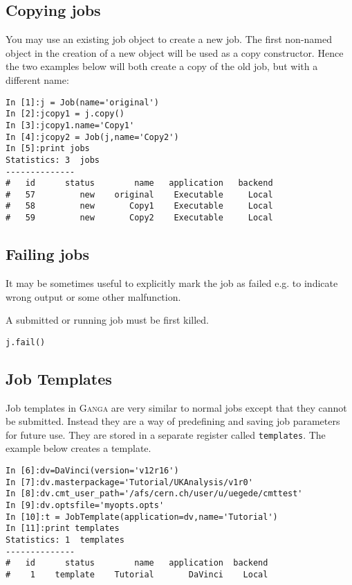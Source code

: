 \documentclass{howto}
\def\ganga {\textsc{Ganga}\xspace}
\begin{document}
\subsection{Copying jobs}
You may use an existing job object to create a new job. The first non-named
object in the creation of a new object will be used as a copy
constructor. Hence the two examples below will both create a copy of the old
job, but with a different name:
\begin{verbatim}
In [1]:j = Job(name='original')
In [2]:jcopy1 = j.copy()
In [3]:jcopy1.name='Copy1'
In [4]:jcopy2 = Job(j,name='Copy2')
In [5]:print jobs
Statistics: 3  jobs
--------------
#   id      status        name   application   backend 
#   57         new    original    Executable     Local 
#   58         new       Copy1    Executable     Local 
#   59         new       Copy2    Executable     Local 
\end{verbatim}

\subsection{Failing jobs}
It may be sometimes useful to explicitly mark the job as failed e.g. to indicate wrong output or some other malfunction. 

A submitted or running job must be first killed.

\begin{verbatim}
j.fail()
\end{verbatim}

\subsection{Job Templates}
Job templates in \ganga are very similar to normal jobs except that they
cannot be submitted. Instead they are a way of predefining and saving job
parameters for future use. They are stored in a separate register called
\texttt{templates}. The example below creates a template.

\begin{verbatim}
In [6]:dv=DaVinci(version='v12r16')
In [7]:dv.masterpackage='Tutorial/UKAnalysis/v1r0'
In [8]:dv.cmt_user_path='/afs/cern.ch/user/u/uegede/cmttest'
In [9]:dv.optsfile='myopts.opts'
In [10]:t = JobTemplate(application=dv,name='Tutorial')
In [11]:print templates
Statistics: 1  templates
--------------
#   id      status        name   application  backend
#    1    template    Tutorial       DaVinci    Local
\end{verbatim}
\end{document}

